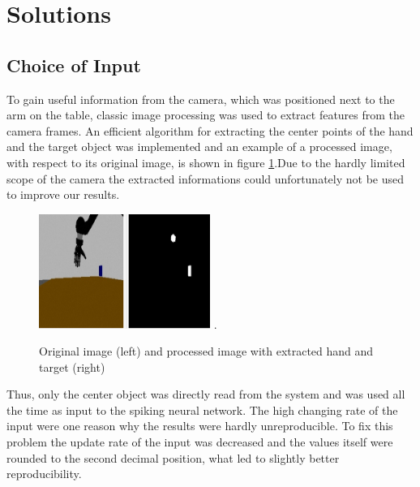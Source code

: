 \section{Solutions}
\subsection{Choice of Input}

To gain useful information from the camera, which was positioned next to the arm on the table, classic image processing was used to extract features from the camera frames. An efficient algorithm for extracting the center points of the hand and the target object was implemented and an example of a processed image, with respect to its original image, is shown in figure \ref{fig:processed_pic}.Due to the hardly limited scope of the camera the extracted informations could unfortunately not be used to improve our results.

\begin{figure}[H]
	\centering
	\includegraphics[width=2.2in]{img/image_processing.png}
	\DeclareGraphicsExtensions.
	\caption{Original image (left) and processed image with extracted hand and target (right)}
	\label{fig:processed_pic}
\end{figure}

Thus, only the center object was directly read from the system and was used all the time as input to the spiking neural network. The high changing rate of the input were one reason why the results were hardly unreproducible. To fix this problem the update rate of the input was decreased and the values itself were rounded to the second decimal position, what led to slightly better reproducibility. 


